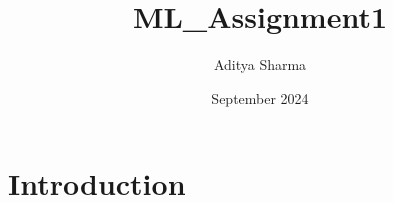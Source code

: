 \documentclass{article}
\title{ML_Assignment1}
\author{Aditya Sharma}
\date{September 2024}
\begin{document}
\section{Introduction}
\end{document}

